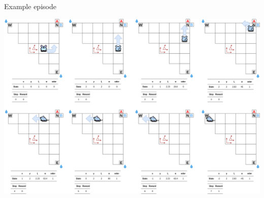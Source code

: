 \documentclass[bigger]{beamer}
\begin{document}
\begin{frame}[label={sec:orge381525}]{Example episode}
\begin{center}
\includegraphics[width=.9\linewidth]{img/env_new-steps.drawio.png}
\end{center}
\end{frame}
\end{document}
